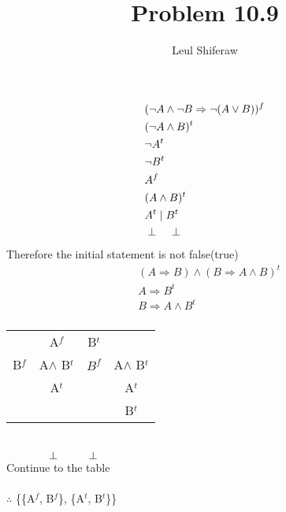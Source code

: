 \documentclass[a4paper]{article}
\title{Problem 10.9}
\author{Leul Shiferaw}
\begin{document}
\maketitle
\newpage
{}

\begin{align*}
	&(\neg A\wedge \neg B \Rightarrow \neg(A\vee B))^f\\
	&(\neg A\wedge B)^t\\
	&\neg A^t\\
	&\neg B^t\\
	&A^f\\
	&(A\wedge B)^t\\
	&A^t\hspace{0.1cm}|\hspace{0.1cm} B^t\\
	&\perp \hspace{0.5cm}\perp
\end{align*}
Therefore the initial statement is not false(true)\\
\newpage
\begin{align*}
	&(A\Rightarrow B) \wedge (B\Rightarrow A\wedge B)^t\\
	&A\Rightarrow B^t\\
	&B\Rightarrow A\wedge B^t\\
\end{align*}
\begin{tabular}{|c|c|c|c|}
	&A$^f$&B$^t$&\\
	B$^f$ & A$\wedge$ B$^t$ & $B^f$ & A$\wedge$ B$^t$\\
	& A$^t$ & & A$^t$\\
	& && B$^t$\\
\end{tabular}
\\
$\indent\indent\hspace{0.2cm}\perp\hspace{1cm}\perp$
\\Continue to the table
\\\\$\therefore$ \{\{A$^f$, B$^f$\}, \{A$^t$, B$^t$\}\}
\end{document}
